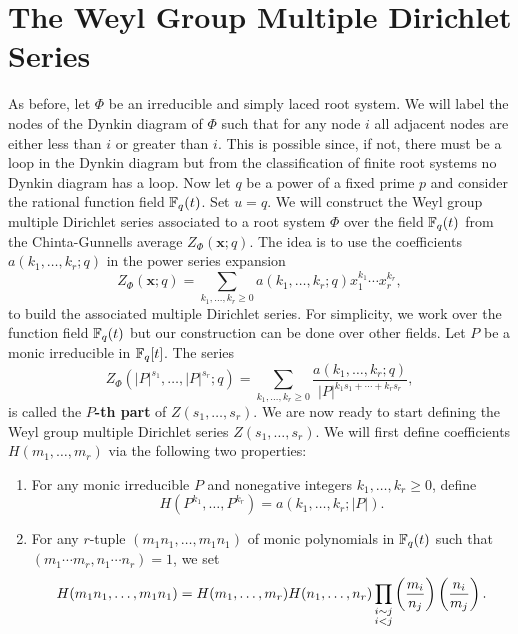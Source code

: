 \documentclass[12pt,reqno,oneside]{amsart}
\begin{document}
\section{The Weyl Group Multiple Dirichlet Series}
    As before, let $\Phi$ be an irreducible and simply laced root system. We will label the nodes of the Dynkin diagram of $\Phi$ such that for any node $i$ all adjacent nodes are either less than $i$ or greater than $i$. This is possible since, if not, there must be a loop in the Dynkin diagram but from the classification of finite root systems no Dynkin diagram has a loop. Now let $q$ be a power of a fixed prime $p$ and consider the rational function field $\mathbb{F}_{q}(t)$. Set $u = q$. We will construct the Weyl group multiple Dirichlet series associated to a root system $\Phi$ over the field $\mathbb{F}_{q}(t)$ from the Chinta-Gunnells average $Z_{\Phi}(\mathbf{x};q)$. The idea is to use the coefficients $a(k_{1},\ldots,k_{r};q)$ in the power series expansion
    \[
        Z_{\Phi}(\mathbf{x};q) = \sum_{k_{1},\ldots,k_{r} \ge 0}a(k_{1},\ldots,k_{r};q)x_{1}^{k_{1}} \cdots x_{r}^{k_{r}},
    \]
    to build the associated multiple Dirichlet series. For simplicity, we work over the function field $\mathbb{F}_{q}(t)$ but our construction can be done over other fields. Let $P$ be a monic irreducible in $\mathbb{F}_{q}[t]$. The series
    \[
        Z_{\Phi}(|P|^{s_{1}},\ldots,|P|^{s_{r}};q) = \sum_{k_{1},\ldots,k_{r} \ge 0}\frac{a(k_{1},\ldots,k_{r};q)}{|P|^{k_{1}s_{1}+\cdots+k_{r}s_{r}}},
    \]
    is called the \textbf{$P$-th part} of $Z(s_{1},\ldots,s_{r})$. We are now ready to start defining the Weyl group multiple Dirichlet series $Z(s_{1},\ldots,s_{r})$. We will first define coefficients $H(m_{1},\ldots,m_{r})$ via the following two properties:
    \begin{enumerate}[label=(\roman*)]
        \item For any monic irreducible $P$ and nonegative integers $k_{1},\ldots,k_{r} \ge 0$, define
        \[
            H(P^{k_{1}},\ldots,P^{k_{r}}) = a(k_{1},\ldots,k_{r};|P|).
        \]
        \item For any $r$-tuple $(m_{1}n_{1},\ldots,m_{1}n_{1})$ of monic polynomials in $\mathbb{F}_{q}(t)$ such that $(m_{1} \cdots m_{r},n_{1} \cdots n_{r}) = 1$, we set
        \[
            H(m_{1}n_{1},\ldots,m_{1}n_{1}) = H(m_{1},\ldots,m_{r})H(n_{1},\ldots,n_{r})\prod_{\substack{i \sim j \\ i < j}}\left(\frac{m_{i}}{n_{j}}\right)\left(\frac{n_{i}}{m_{j}}\right).
        \]
    \end{enumerate}
\end{document}
